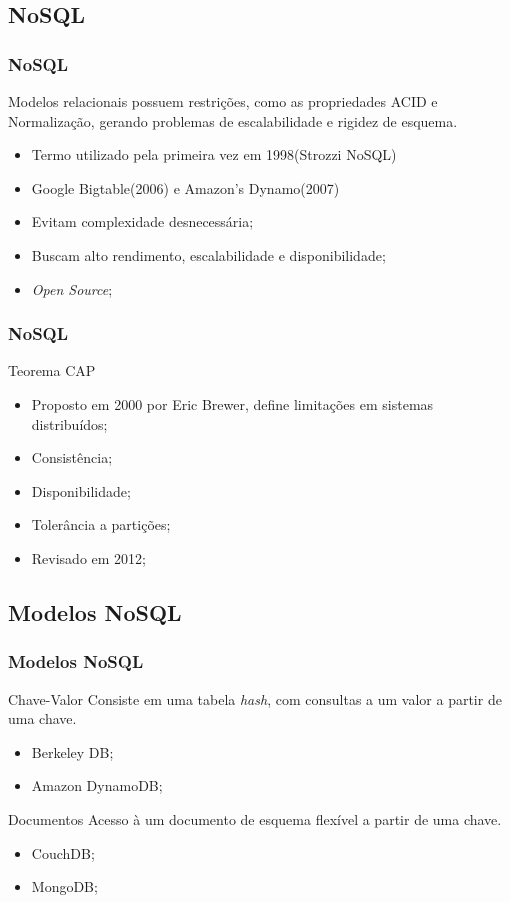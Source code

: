 \documentclass[brazil]{beamer}
\begin{document}
\subsection{NoSQL}

\begin{frame}
\frametitle{NoSQL}
	Modelos relacionais possuem restrições, como as propriedades ACID e Normalização, gerando problemas de escalabilidade e rigidez de esquema.
	\begin{itemize}
		\item Termo utilizado pela primeira vez em 1998(Strozzi NoSQL)
		\item Google Bigtable(2006) e Amazon's Dynamo(2007)
		\item Evitam complexidade desnecessária;
		\item Buscam alto rendimento, escalabilidade e disponibilidade;
		\item \emph{Open Source};
	\end{itemize}	
\end{frame}


\begin{frame}
	\frametitle{NoSQL}
	\begin{block}{Teorema CAP}
	\begin{itemize}
		\item Proposto em 2000 por Eric Brewer, define limitações em sistemas distribuídos;
		\item Consistência;
		\item Disponibilidade;
		\item Tolerância a partições;
		\bigskip
		\item Revisado em 2012;
	\end{itemize}
	\end{block}
\end{frame}

\subsection{Modelos NoSQL}
\begin{frame}
	\frametitle{Modelos NoSQL}
	
	\begin{block}{Chave-Valor}
		Consiste em uma tabela \emph{hash}, com consultas a um valor a partir de uma chave.
		\begin{itemize}
			\item Berkeley DB;
			\item Amazon DynamoDB;
		\end{itemize}
	\end{block}

	\begin{block}{Documentos}
		Acesso à um documento de esquema flexível a partir de uma chave.
	
		\begin{itemize}
			\item CouchDB;
			\item MongoDB;
		\end{itemize}
	\end{block}

\end{frame}
\end{document}

